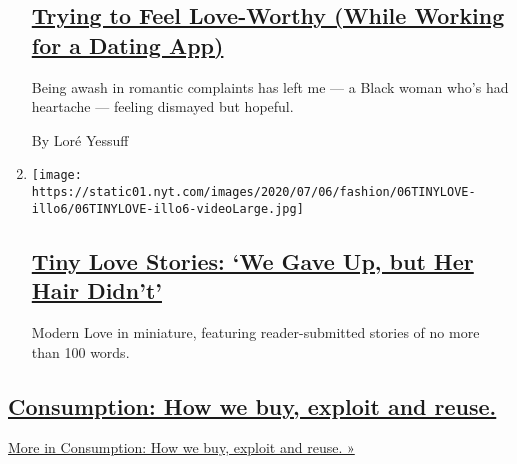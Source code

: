 \begin{enumerate}
  \hypertarget{trying-to-feel-love-worthy-while-working-for-a-dating-app}{%
  \subsection{\texorpdfstring{\href{/2020/07/17/style/modern-love-feel-love-worthy-working-for-dating-app.html}{Trying
  to Feel Love-Worthy (While Working for a Dating
  App)}}{Trying to Feel Love-Worthy (While Working for a Dating App)}}\label{trying-to-feel-love-worthy-while-working-for-a-dating-app}}

  Being awash in romantic complaints has left me --- a Black woman who's
  had heartache --- feeling dismayed but hopeful.

  By Loré Yessuff
\item
  \texttt{[image: https://static01.nyt.com/images/2020/07/06/fashion/06TINYLOVE-illo6/06TINYLOVE-illo6-videoLarge.jpg]}

  \hypertarget{tiny-love-stories-we-gave-up-but-her-hair-didnt}{%
  \subsection{\texorpdfstring{\href{/2020/07/14/style/tiny-modern-love-stories-coronavirus-we-gave-up-but-her-hair-didnt.html}{Tiny
  Love Stories: `We Gave Up, but Her Hair
  Didn't'}}{Tiny Love Stories: `We Gave Up, but Her Hair Didn't'}}\label{tiny-love-stories-we-gave-up-but-her-hair-didnt}}

  Modern Love in miniature, featuring reader-submitted stories of no
  more than 100 words.
\end{enumerate}

\hypertarget{consumption-how-we-buy-exploit-and-reuse}{%
\subsection{\texorpdfstring{\href{/issue/fashion/2019/12/16/consumption}{Consumption:
How we buy, exploit and
reuse.}}{Consumption: How we buy, exploit and reuse.}}\label{consumption-how-we-buy-exploit-and-reuse}}

\href{/issue/fashion/2019/12/16/consumption}{More in Consumption: How we
buy, exploit and reuse. »}

